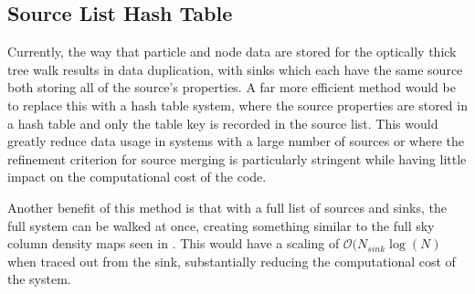 \subsection{Source List Hash Table}

Currently, the way that particle and node data are stored for the optically thick tree walk results in data duplication, with sinks which each have the same source both storing all of the source's properties. A far more efficient method would be to replace this with a hash table system, where the source properties are stored in a hash table and only the table key is recorded in the source list. This would greatly reduce data usage in systems with a large number of sources or where the refinement criterion for source merging is particularly stringent while having little impact on the computational cost of the code.

Another benefit of this method is that with a full list of sources and sinks, the full system can be walked at once, creating something similar to the full sky column density maps seen in \citet{treeRay}. This would have a scaling of $\mathcal{O}(N_{sink}\log(N)$ when traced out from the sink, substantially reducing the computational cost of the system.